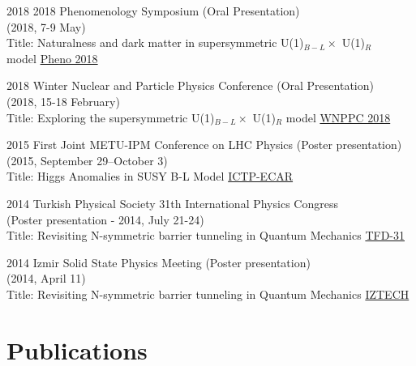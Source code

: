 \documentclass[]{friggeri-cv}
\begin{document}
\begin{entrylist}
	
	\entry
	{2018}
	{2018 Phenomenology Symposium  \normalfont (Oral Presentation) \\ (2018, 7-9 May) \\
		Title: Naturalness and dark matter in supersymmetric U(1)$_{B-L} \times$ U(1)$_R$ \\ model}
	{\href{https://indico.cern.ch/event/699148/}{Pheno 2018}} 
	
	\entry
	{2018}
	{Winter Nuclear and Particle Physics Conference  \normalfont (Oral Presentation) \\ (2018, 15-18 February) \\
	Title: Exploring the supersymmetric U(1)$_{B-L} \times$ U(1)$_R$ model}
	{\href{http://wnppc.triumf.ca/2018/}{WNPPC 2018}}
	
	\entry
	{2015}
	{First Joint METU-IPM Conference on LHC Physics  \normalfont (Poster presentation) \\ (2015, September 29--October 3) \\
	Title: Higgs Anomalies in SUSY B-L Model}
	{\href{http://ictp-ecar.org/events/first-joint-metu-ipm-conference-on-lhc-physics/}{ICTP-ECAR}}
	
	\entry
	{2014}
	{Turkish Physical Society 31th International Physics Congress \\ \normalfont (Poster presentation - 2014, July 21-24) \\
	Title: Revisiting N-symmetric barrier tunneling in Quantum Mechanics}
	{\href{http://www.tfd.com.tr/arsiv/TFD/31/en/default.htm}{TFD-31}}

	\entry
	{2014}
	{Izmir Solid State Physics Meeting  \normalfont (Poster presentation) \\ (2014, April 11) \\
		Title: Revisiting N-symmetric barrier tunneling in Quantum Mechanics}
	{\href{http://ymf.iyte.edu.tr/?page_id=234}{IZTECH}}
	

\end{entrylist}


\newpage

\section{Publications}
\end{document}
